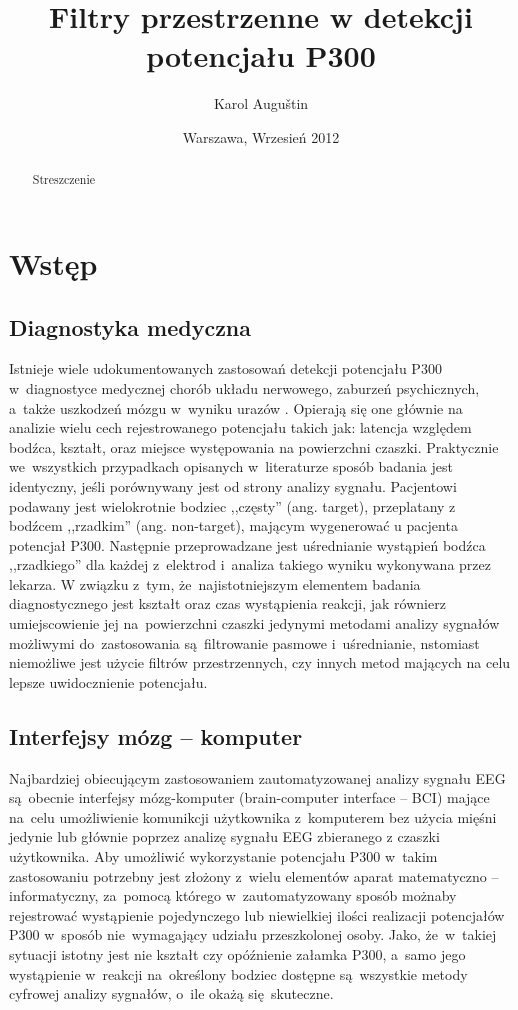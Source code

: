 \documentclass[licencjacka,openright]{pracamgr}
\author{ Karol Auguštin }
\title{ Filtry przestrzenne w detekcji potencjału P300 }
\date{Warszawa, Wrzesień 2012}
\begin{document}
\let\cleardoublepage\clearpage
\maketitle
\begin{abstract}
\par Streszczenie
\end{abstract}
\tableofcontents

\chapter{Wstęp}
\section{Diagnostyka medyczna}
Istnieje wiele udokumentowanych zastosowań detekcji potencjału P300 w~diagnostyce medycznej chorób układu nerwowego, zaburzeń psychicznych, a~także uszkodzeń mózgu w~wyniku urazów \citep{zgorzalewicz2000}. Opierają się one głównie na analizie wielu cech rejestrowanego potencjału takich jak: latencja względem bodźca, kształt, oraz miejsce występowania na powierzchni czaszki. Praktycznie we~wszystkich przypadkach opisanych w~literaturze sposób badania jest identyczny, jeśli porównywany jest od strony analizy sygnału. Pacjentowi podawany jest wielokrotnie bodziec ,,częsty'' (ang. target), przeplatany z bodźcem ,,rzadkim'' (ang. non-target), mającym wygenerować u pacjenta potencjał P300. Następnie przeprowadzane jest uśrednianie wystąpień bodźca ,,rzadkiego'' dla każdej z~elektrod i~analiza takiego wyniku wykonywana przez lekarza. W związku z~tym, że~najistotniejszym elementem badania diagnostycznego jest kształt oraz czas wystąpienia reakcji, jak równierz umiejscowienie jej na~powierzchni czaszki jedynymi metodami analizy sygnałów możliwymi do~zastosowania są~filtrowanie pasmowe i~uśrednianie, nstomiast niemożliwe jest użycie filtrów przestrzennych, czy innych metod mających na celu lepsze uwidocznienie potencjału.
\section{Interfejsy mózg -- komputer}
Najbardziej obiecującym zastosowaniem zautomatyzowanej analizy sygnału EEG są~obecnie interfejsy mózg-komputer (brain-computer interface -- BCI) mające na~celu umożliwienie komunikcji użytkownika z~komputerem bez użycia mięśni jedynie lub głównie poprzez analizę sygnału EEG zbieranego z czaszki użytkownika. Aby umożliwić wykorzystanie potencjału P300 w~takim zastosowaniu potrzebny jest złożony z~wielu elementów aparat matematyczno -- informatyczny, za~pomocą którego w~zautomatyzowany sposób możnaby rejestrować wystąpienie pojedynczego lub niewielkiej ilości realizacji potencjałów P300 w~sposób nie~wymagający udziału przeszkolonej osoby. Jako, że~w~takiej sytuacji istotny jest nie kształt czy opóźnienie załamka P300, a~samo jego wystąpienie w~reakcji na~określony bodziec dostępne są~wszystkie metody cyfrowej analizy sygnałów, o~ile okażą się~skuteczne.
\end{document}
